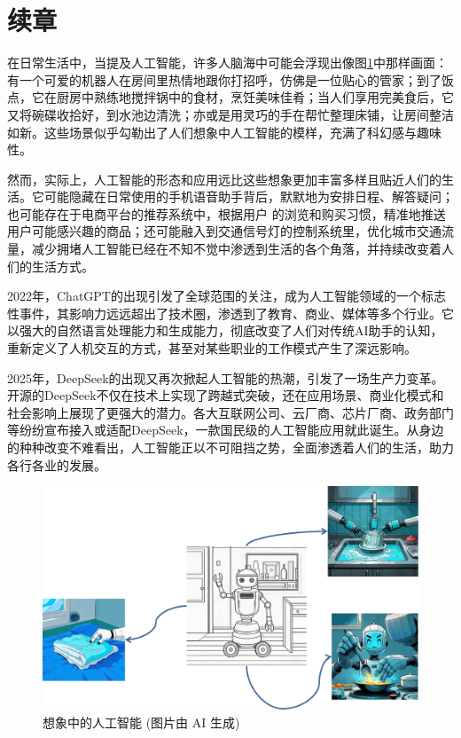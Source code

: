 \chapter* {续章}



在日常生活中，当提及人工智能，许多人脑海中可能会浮现出像图\ref{想象中的人工智能}中那样画面：有一个可爱的机器人在房间里热情地跟你打招呼，仿佛是一位贴心的管家；到了饭点，它在厨房中熟练地搅拌锅中的食材，烹饪美味佳肴；当人们享用完美食后，它又将碗碟收拾好，到水池边清洗；亦或是用灵巧的手在帮忙整理床铺，让房间整洁如新。这些场景似乎勾勒出了人们想象中人工智能的模样，充满了科幻感与趣味性。

然而，实际上，人工智能的形态和应用远比这些想象更加丰富多样且贴近人们的生活。它可能隐藏在日常使用的手机语音助手背后，默默地为安排日程、解答疑问；也可能存在于电商平台的推荐系统中，根据用户 的浏览和购买习惯，精准地推送用户可能感兴趣的商品；还可能融入到交通信号灯的控制系统里，优化城市交通流量，减少拥堵人工智能已经在不知不觉中渗透到生活的各个角落，并持续改变着人们的生活方式。

2022年，ChatGPT的出现引发了全球范围的关注，成为人工智能领域的一个标志性事件，其影响力远远超出了技术圈，渗透到了教育、商业、媒体等多个行业。它以强大的自然语言处理能力和生成能力，彻底改变了人们对传统AI助手的认知，重新定义了人机交互的方式，甚至对某些职业的工作模式产生了深远影响。

2025年，DeepSeek的出现又再次掀起人工智能的热潮，引发了一场生产力变革。开源的DeepSeek不仅在技术上实现了跨越式突破，还在应用场景、商业化模式和社会影响上展现了更强大的潜力。各大互联网公司、云厂商、芯片厂商、政务部门等纷纷宣布接入或适配DeepSeek，一款国民级的人工智能应用就此诞生。从身边的种种改变不难看出，人工智能正以不可阻挡之势，全面渗透着人们的生活，助力各行各业的发展。




\begin{figure}[htb]
	\centering
	\includegraphics[width=\linewidth]{image/0/想象中的人工智能.png}
	\caption{想象中的人工智能 (图片由 AI 生成)}
        \label{想象中的人工智能}
\end{figure}

